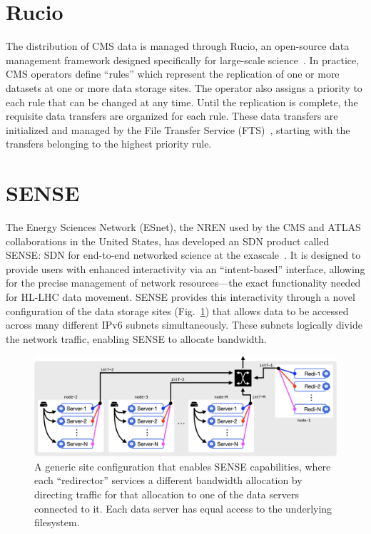\section{Rucio}
The distribution of CMS data is managed through Rucio, an open-source data management framework designed specifically for large-scale science~\cite{Rucio2019}. 
In practice, CMS operators define ``rules'' which represent the replication of one or more datasets at one or more data storage sites. 
The operator also assigns a priority to each rule that can be changed at any time. 
Until the replication is complete, the requisite data transfers are organized for each rule. 
These data transfers are initialized and managed by the File Transfer Service (FTS)~\cite{FTS3}, starting with the transfers belonging to the highest priority rule. 

\section{SENSE}
The Energy Sciences Network (ESnet), the NREN used by the CMS and ATLAS collaborations in the United States, has developed an SDN product called SENSE: SDN for end-to-end networked science at the exascale~\cite{SENSE}. 
It is designed to provide users with enhanced interactivity via an ``intent-based'' interface, allowing for the precise management of network resources---the exact functionality needed for HL-LHC data movement. 
SENSE provides this interactivity through a novel configuration of the data storage sites (Fig.~\ref{fig:sense_site}) that allows data to be accessed across many different IPv6 subnets simultaneously. 
These subnets logically divide the network traffic, enabling SENSE to allocate bandwidth. 

\begin{figure}[htb]
    \centering
    \includegraphics[width=.9\textwidth]{fig/cyber/rucio-sense_site.png}
    \caption[Rucio-SENSE site configuration]{
        A generic site configuration that enables SENSE capabilities, where each ``redirector'' services a different bandwidth allocation by directing traffic for that allocation to one of the data servers connected to it. 
        Each data server has equal access to the underlying filesystem.
    }
    \label{fig:sense_site}
\end{figure}


